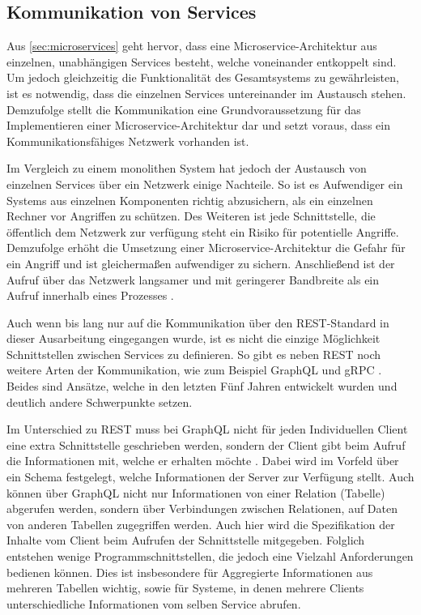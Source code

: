 \subsection{Kommunikation von Services}
\label{sec:kommunikation}

Aus \cref{sec:microservices} geht hervor, dass eine Microservice-Architektur aus einzelnen, unabhängigen Services besteht, welche voneinander entkoppelt sind. Um jedoch gleichzeitig die Funktionalität des Gesamtsystems zu gewährleisten, ist es notwendig, dass die einzelnen Services untereinander im Austausch stehen. Demzufolge stellt die Kommunikation eine Grundvoraussetzung für das Implementieren einer Microservice-Architektur dar und setzt voraus, dass ein Kommunikationsfähiges Netzwerk vorhanden ist.

Im Vergleich zu einem monolithen System hat jedoch der Austausch von einzelnen Services über ein Netzwerk einige Nachteile. So ist es Aufwendiger ein Systems aus einzelnen Komponenten richtig abzusichern, als ein einzelnen Rechner vor Angriffen zu schützen. Des Weiteren ist jede Schnittstelle, die öffentlich dem Netzwerk zur verfügung steht ein Risiko für potentielle Angriffe. Demzufolge erhöht die Umsetzung einer Microservice-Architektur die Gefahr für ein Angriff und ist gleichermaßen aufwendiger zu sichern. Anschließend ist der Aufruf über das Netzwerk langsamer und mit geringerer Bandbreite als ein Aufruf innerhalb eines Prozesses \parencite[vgl.][Kap. 6.1]{wolff_microservices_2018}.

Auch wenn bis lang nur auf die Kommunikation über den REST-Standard in dieser Ausarbeitung eingegangen wurde, ist es nicht die einzige Möglichkeit Schnittstellen zwischen Services zu definieren. So gibt es neben REST noch weitere Arten der Kommunikation, wie zum Beispiel GraphQL \parencite{graphql_docs} und gRPC \parencite{grpc_docs}. Beides sind Ansätze, welche in den letzten Fünf Jahren entwickelt wurden und deutlich andere Schwerpunkte setzen.

Im Unterschied zu REST muss bei GraphQL nicht für jeden Individuellen Client eine extra Schnittstelle geschrieben werden, sondern der Client gibt beim Aufruf die Informationen mit, welche er erhalten möchte \parencite[vgl.][]{graphql_docs}. Dabei wird im Vorfeld über ein Schema festgelegt, welche Informationen der Server zur Verfügung stellt. Auch können über GraphQL nicht nur Informationen von einer Relation (Tabelle) abgerufen werden, sondern über Verbindungen zwischen Relationen, auf Daten von anderen Tabellen zugegriffen werden. Auch hier wird die Spezifikation der Inhalte vom Client beim Aufrufen der Schnittstelle mitgegeben. Folglich entstehen wenige Programmschnittstellen, die jedoch eine Vielzahl Anforderungen bedienen können. Dies ist insbesondere für Aggregierte Informationen aus mehreren Tabellen wichtig, sowie für Systeme, in denen mehrere Clients unterschiedliche Informationen vom selben Service abrufen.

